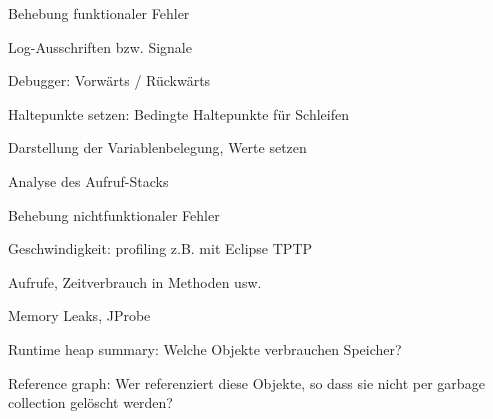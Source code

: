 \documentclass[a4paper]{article}
\begin{document}
\begin{multicols}{3}
  Behebung funktionaler Fehler
  \begin{itemize*}
    \item Log-Ausschriften bzw. Signale
    \item Debugger: Vorwärts / Rückwärts
    \item Haltepunkte setzen: Bedingte Haltepunkte für Schleifen
    \item Darstellung der Variablenbelegung, Werte setzen
    \item Analyse des Aufruf-Stacks
  \end{itemize*}

  Behebung nichtfunktionaler Fehler
  \begin{itemize*}
    \item Geschwindigkeit: profiling z.B. mit Eclipse TPTP
    \item Aufrufe, Zeitverbrauch in Methoden usw.
  \end{itemize*}

  Memory Leaks, JProbe
  \begin{itemize*}
    \item Runtime heap summary: Welche Objekte verbrauchen Speicher?
    \item Reference graph: Wer referenziert diese Objekte, so dass sie nicht per garbage collection gelöscht werden?
  \end{itemize*}


\end{multicols}
\end{document}
